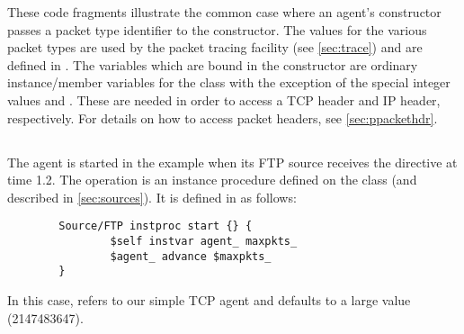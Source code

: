 These code fragments illustrate the common case where an agent's
constructor passes a packet type identifier to the 
constructor.
The values for the various packet types are used by the packet tracing
facility (see \ref{sec:trace}) and are defined in .
The variables which are bound in the  constructor
are ordinary instance/member variables for the class
with the exception of the special integer values 
and .
These are needed in order to access a TCP header and IP header,
respectively.
For details on how to access packet headers, see \ref{sec:ppackethdr}.

\subsection{}

The  agent is started in the example when its
FTP source receives the  directive at time 1.2.
The  operation is an instance procedure defined on the
 class (and described in \ref{sec:sources}).
It is defined in  as follows:
\begin{small}
\begin{verbatim}
        Source/FTP instproc start {} {
                $self instvar agent_ maxpkts_
                $agent_ advance $maxpkts_
        }
\end{verbatim}
\end{small}
In this case,  refers to our simple TCP agent and
 defaults to a large value (2147483647).

